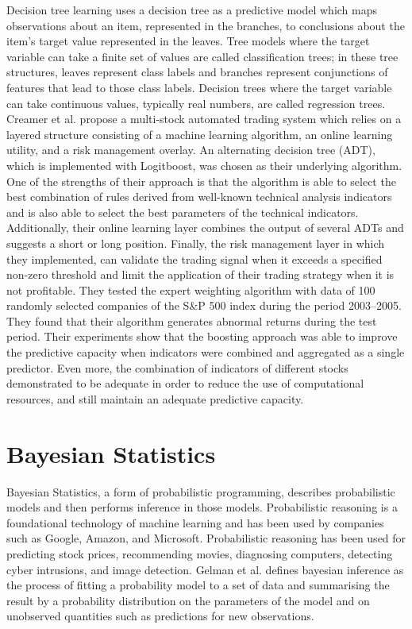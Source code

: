 Decision tree learning uses a decision tree as a predictive model which maps observations about an item, represented in the branches, to conclusions about the item's target value represented in the leaves. Tree models where the target variable can take a finite set of values are called classification trees; in these tree structures, leaves represent class labels and branches represent conjunctions of features that lead to those class labels. Decision trees where the target variable can take continuous values, typically real numbers, are called regression trees. Creamer et al. propose a multi-stock automated trading system which relies on a layered structure consisting of a machine learning algorithm, an online learning utility, and a risk management overlay.\cite{Creamer:2010aa} An alternating decision tree (ADT), which is implemented with Logitboost, was chosen as their underlying algorithm. One of the strengths of their approach is that the algorithm is able to select the best combination of rules derived from well-known technical analysis indicators and is also able to select the best parameters of the technical indicators. Additionally, their online learning layer combines the output of several ADTs and suggests a short or long position. Finally, the risk management layer in which they implemented, can validate the trading signal when it exceeds a specified non-zero threshold and limit the application of their trading strategy when it is not profitable. They tested the expert weighting algorithm with data of 100 randomly selected companies of the S\&P 500 index during the period 2003–2005. They found that their algorithm generates abnormal returns during the test period. Their experiments show that the boosting approach was able to improve the predictive capacity when indicators were combined and aggregated as a single predictor. Even more, the combination of indicators of different stocks demonstrated to be adequate in order to reduce the use of computational resources, and still maintain an adequate predictive capacity.

\section{Bayesian Statistics}

Bayesian Statistics, a form of probabilistic programming, describes probabilistic models and then performs inference in those models. Probabilistic reasoning is a foundational technology of machine learning and has been used by companies such as Google, Amazon, and Microsoft. Probabilistic reasoning has been used for predicting stock prices, recommending movies, diagnosing computers, detecting cyber intrusions, and image detection. Gelman et al. defines bayesian inference as the process of fitting a probability model to a set of data and summarising the result by a probability distribution on the parameters of the model and on unobserved quantities such as predictions for new observations.\cite{Gelman:2014aa}

